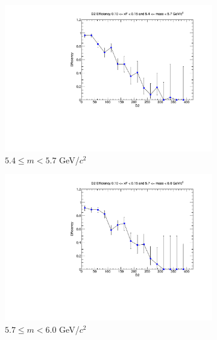 \begin{figure}[p]
\begin{subfigure}[b]{0.32\textwidth}
        \includegraphics[width=\textwidth]{./kTrackerEfficiencyPlots/D2_Efficiency_xF2_mass4.pdf}
        \caption{$5.4 \leq m < 5.7$ GeV/$c^2$}
        \label{fig:xF2_mass4}
    \end{subfigure}
    \hfill
    \begin{subfigure}[b]{0.32\textwidth}
        \centering
        \includegraphics[width=\textwidth]{./kTrackerEfficiencyPlots/D2_Efficiency_xF2_mass5.pdf}
        \caption{$5.7 \leq m < 6.0$ GeV/$c^2$}
        \label{fig:xF2_mass5}
    \end{subfigure}
    \vspace{0.5cm}
    \begin{subfigure}[b]{0.32\textwidth}
        \centering

\end{subfigure}
\end{figure}

